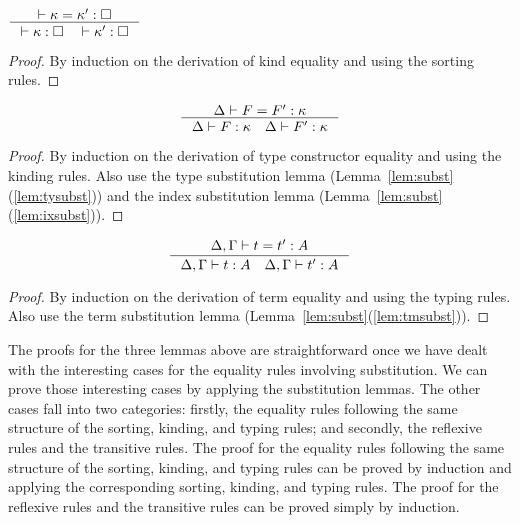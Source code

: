 \begin{lemma}\label{lem:wfeqkind}
$ \inference{|- \kappa = \kappa':\square}
	{|- \kappa:\square \quad |- \kappa':\square} $
\end{lemma}
\begin{proof}
	By induction on the derivation of kind equality
	and using the sorting rules.
\end{proof}

\begin{lemma}\label{lem:wfeqtype}
\[ \inference{\Delta |- F = F':\kappa}
	{\Delta |- F:\kappa \quad \Delta |- F':\kappa}
\]
\end{lemma}
\begin{proof}
	By induction on the derivation of type constructor equality
	and using the kinding rules.
	Also use the type substitution lemma
	(Lemma~\ref{lem:subst}(\ref{lem:tysubst}))
	and the index substitution lemma
	(Lemma~\ref{lem:subst}(\ref{lem:ixsubst})).  
\end{proof}

\begin{lemma}\label{lem:wfeqterm}
\[ \inference{\Delta,\Gamma |- t = t':A}
	{\Delta,\Gamma |- t:A \quad \Delta,\Gamma |- t':A}
\]
\end{lemma}
\begin{proof}
	By induction on the derivation of term equality
	and using the typing rules.
	Also use the term substitution lemma
	(Lemma~\ref{lem:subst}(\ref{lem:tmsubst})).
\end{proof}

The proofs for the three lemmas above are straightforward
once we have dealt with the interesting cases for the equality rules
involving substitution. We can prove those interesting cases
by applying the substitution lemmas. The other cases fall into two
categories: firstly, the equality rules following the same structure of
the sorting, kinding, and typing rules; and secondly, the reflexive
rules and the transitive rules. The proof for the equality rules
following the same structure of the sorting, kinding, and typing rules
can be proved by induction and applying the corresponding
sorting, kinding, and typing rules. The proof for the reflexive rules
and the transitive rules can be proved simply by induction.

